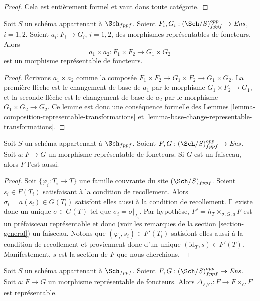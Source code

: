 \begin{proof}
Cela est entièrement formel et vaut dans toute catégorie.
\end{proof}

\begin{lemma}
\label{lemma-product-representable-transformations}
Soit $S$ un schéma appartenant à $\Sch_{fppf}$.
Soient $F_i, G_i : (\Sch/S)_{fppf}^{opp} \to \textit{Ens}$, $i = 1, 2$.
Soient $a_i : F_i \to G_i$, $i = 1, 2$,
des morphismes représentables de foncteurs.
Alors
$$
a_1 \times a_2 : F_1 \times F_2 \longrightarrow G_1 \times G_2
$$
est un morphisme représentable de foncteurs.
\end{lemma}

\begin{proof}
Écrivons $a_1 \times a_2$ comme la composée
$F_1 \times F_2 \to G_1 \times F_2 \to G_1 \times G_2$.
La première flèche est le changement de base de $a_1$ par le morphisme
$G_1 \times F_2 \to G_1$, et la seconde flèche
est le changement de base de $a_2$ par le morphisme
$G_1 \times G_2 \to G_2$. Ce lemme est donc une conséquence
formelle des Lemmes \ref{lemma-composition-representable-transformations}
et \ref{lemma-base-change-representable-transformations}.
\end{proof}

\begin{lemma}
\label{lemma-representable-transformation-to-sheaf}
Soit $S$ un schéma appartenant à $\Sch_{fppf}$.
Soient $F, G : (\Sch/S)_{fppf}^{opp} \to \textit{Ens}$.
Soit $a : F \to G$ un morphisme représentable de foncteurs.
Si $G$ est un faisceau, alors $F$ l'est aussi.
\end{lemma}

\begin{proof}
Soit $\{\varphi_i : T_i \to T\}$ une famille couvrante du site
$(\Sch/S)_{fppf}$.
Soient $s_i \in F(T_i)$ satisfaisant à la condition de recollement.
Alors $\sigma_i = a(s_i) \in G(T_i)$ satisfont elles aussi à la condition de recollement.
Il existe donc un unique $\sigma \in G(T)$ tel
que $\sigma_i = \sigma|_{T_i}$. Par hypothèse,
$F' = h_T \times_{\sigma, G, a} F$ est un préfaisceau représentable
et donc (voir les remarques de la section \ref{section-general}) un faisceau.
Notons que $(\varphi_i, s_i) \in F'(T_i)$ satisfont
elles aussi à la condition de recollement et proviennent donc d'un unique
$(\text{id}_T, s) \in F'(T)$. Manifestement, $s$ est la section de
$F$ que nous cherchions.
\end{proof}

\begin{lemma}
\label{lemma-representable-transformation-diagonal}
Soit $S$ un schéma appartenant à $\Sch_{fppf}$.
Soient $F, G : (\Sch/S)_{fppf}^{opp} \to \textit{Ens}$.
Soit $a : F \to G$ un morphisme représentable de foncteurs.
Alors $\Delta_{F/G} : F \to F \times_G F$ est représentable.
\end{lemma}

